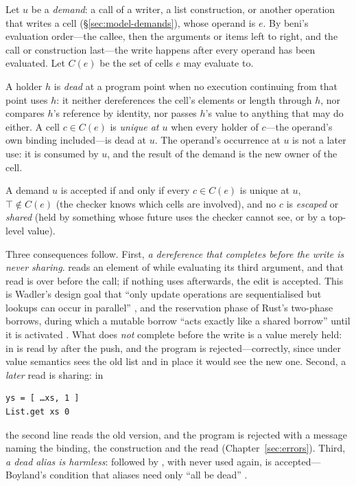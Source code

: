 Let $u$ be a \emph{demand}: a call of a writer, a list construction, or another operation that writes
a cell (\S\ref{sec:model-demands}), whose operand is $e$. By beni's evaluation order---the callee, then
the arguments or items left to right, and the call or construction last---the write happens after every
operand has been evaluated. Let $C(e)$ be the set of cells $e$ may evaluate to.

\begin{definition}
\label{def:unique}
A holder $h$ is \emph{dead} at a program point when no execution continuing from that point uses $h$:
it neither dereferences the cell's elements or length through $h$, nor compares $h$'s reference by
identity, nor passes $h$'s value to anything that may do either. A cell $c \in C(e)$ is \emph{unique
at $u$} when every holder of $c$---the operand's own binding included---is dead at $u$. The operand's
occurrence at $u$ is not a later use: it is consumed by $u$, and the result of the demand is the new
owner of the cell.
\end{definition}

\begin{definition}
A demand $u$ is accepted if and only if every $c \in C(e)$ is unique at $u$, $\top \notin C(e)$ (the
checker knows which cells are involved), and no $c$ is \emph{escaped} or \emph{shared} (held by
something whose future uses the checker cannot see, or by a top-level value).
\end{definition}

Three consequences follow. First, \emph{a dereference that completes before the write is never
sharing}.  reads an element of  while evaluating its
third argument, and that read is over before the call; if nothing uses  afterwards, the edit
is accepted. This is Wadler's design goal that ``only update operations are sequentialised but lookups
can occur in parallel'' \citep[\S3]{wadler1991use}, and the reservation phase of Rust's two-phase
borrows, during which a mutable borrow ``acts exactly like a shared borrow'' until it is activated
\citep{rfc2025}. What does \emph{not} complete before the write is a value merely held:  in
 is read by  after the push, and the program is
rejected---correctly, since under value semantics  sees the old list and in place it
would see the new one. Second, a \emph{later} read is sharing: in
\begin{Verbatim}
ys = [ …xs, 1 ]
List.get xs 0
\end{Verbatim}
the second line reads the old version, and the program is rejected with a message naming the binding,
the construction and the read (Chapter~\ref{sec:errors}). Third, \emph{a dead alias is harmless}:
 followed by \code{[ …xs, 1 ]}, with  never used again, is accepted---Boyland's
condition that aliases need only ``all be dead'' \citep[\S3.2]{boyland2001alias}.

